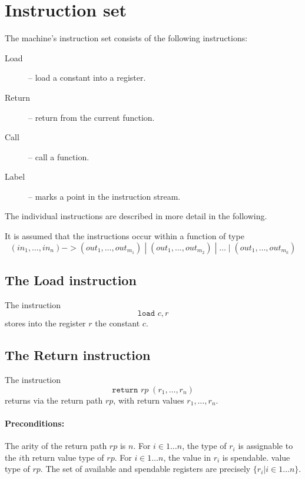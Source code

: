 \documentclass[a4paper]{report}
\begin{document}
\section{Instruction set}

The machine's instruction set consists of the following instructions:

\begin{description}
\item[Load] -- load a constant into a register.
\item[Return] -- return from the current function.
\item[Call] -- call a function.
\item[Label] -- marks a point in the instruction stream.
\end{description}

The individual instructions are described in more detail in the following.

It is assumed that the instructions occur within a function of type
$$
(in_1, \ldots, in_n) -> (out_1, \ldots, out_{m_1}) \;|\; (out_1, \ldots, out_{m_2}) \;|\; \ldots \;|\; (out_1, \ldots, out_{m_k})
$$

\subsection{The Load instruction}
The instruction
$$
\texttt{load } c, r
$$
stores into the register $r$ the constant $c$.

\subsection{The Return instruction}
The instruction
$$
\texttt{return } rp\; (r_1, \ldots, r_n)
$$
returns via the return path $rp$, with return values $r_1, \ldots, r_n$.

\paragraph{Preconditions:}
The arity of the return path $rp$ is $n$.
For $i \in 1 \ldots n$, the type of $r_i$ is assignable to the $i$th return
value type of $rp$.
For $i \in 1 \ldots n$, the value in $r_i$ is spendable.
value type of $rp$.
The set of available and spendable registers are precisely $\{r_i | i \in 1 \ldots n\}$.
\end{document}
